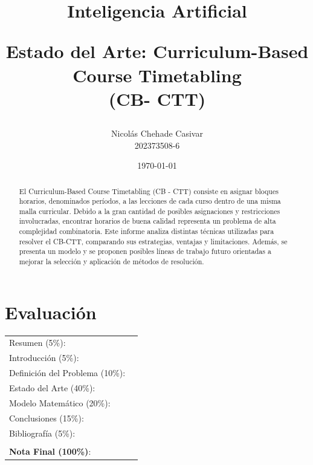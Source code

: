 \documentclass[letter, 10pt]{article}
\begin{document}
\title{Inteligencia Artificial \\ \begin{Large}Estado del Arte: Curriculum-Based Course Timetabling \\(CB- CTT)\end{Large}}
\author{Nicol\'as Chehade Casivar \\ 202373508-6}
\date{\today}
\maketitle


\section{Evaluaci\'on}

\begin{tabular}{ll}
Resumen (5\%): & \underline{\hspace{2cm}} \\
Introducci\'on (5\%):  & \underline{\hspace{2cm}} \\
Definici\'on del Problema (10\%):  & \underline{\hspace{2cm}} \\
Estado del Arte (40\%):  & \underline{\hspace{2cm}} \\
Modelo Matem\'atico (20\%): &  \underline{\hspace{2cm}}\\
Conclusiones (15\%): &  \underline{\hspace{2cm}}\\
Bibliograf\'ia (5\%): & \underline{\hspace{2cm}}\\
 &  \\
\textbf{Nota Final (100\%)}:   & \underline{\hspace{2cm}}
\end{tabular}
\vspace{2cm}


\begin{abstract}

El Curriculum-Based Course Timetabling (CB - CTT) consiste en asignar bloques horarios, denominados per\'iodos, a las lecciones de cada curso dentro de una misma malla curricular. Debido a la gran cantidad de posibles asignaciones y restricciones involucradas, encontrar horarios de buena calidad representa un problema de alta complejidad combinatoria. Este informe analiza distintas t\'ecnicas utilizadas para resolver el CB-CTT, comparando sus estrategias, ventajas y limitaciones. Adem\'as, se presenta un modelo y se proponen posibles l\'ineas de trabajo futuro orientadas a mejorar la selecci\'on y aplicaci\'on de m\'etodos de resoluci\'on.
\end{abstract}
\end{document}
